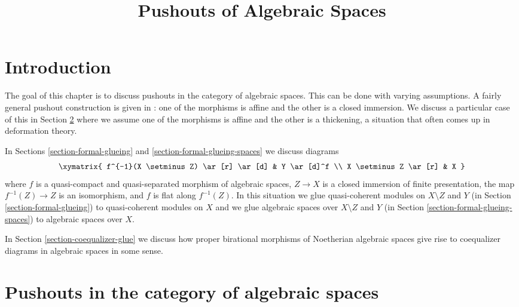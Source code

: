 

%


\title{Pushouts of Algebraic Spaces}


\maketitle

\label{section-phantom}

\tableofcontents

\section{Introduction}
\label{section-introduction}

\noindent
The goal of this chapter is to discuss pushouts in the category of
algebraic spaces. This can be done with varying assumptions.
A fairly general pushout construction is given in \cite{Temkin-Tyomkin}:
one of the morphisms is affine and the other is a closed immersion.
We discuss a particular case of this in Section \ref{section-pushouts}
where we assume one of the morphisms is affine and the other is a
thickening, a situation that often comes up in deformation theory.

\medskip\noindent
In Sections \ref{section-formal-glueing} and
\ref{section-formal-glueing-spaces} we discuss diagrams
$$
\xymatrix{
f^{-1}(X \setminus Z) \ar[r] \ar[d] & Y \ar[d]^f \\
X \setminus Z \ar[r] & X
}
$$
where $f$ is a quasi-compact and quasi-separated morphism of
algebraic spaces, $Z \to X$ is a closed immersion of finite presentation,
the map $f^{-1}(Z) \to Z$ is an isomorphism, and
$f$ is flat along $f^{-1}(Z)$. In this situation we glue
quasi-coherent modules on $X \setminus Z$ and $Y$
(in Section \ref{section-formal-glueing}) to quasi-coherent modules on $X$
and we glue algebraic spaces over $X \setminus Z$ and $Y$
(in Section \ref{section-formal-glueing-spaces}) to algebraic spaces over $X$.

\medskip\noindent
In Section \ref{section-coequalizer-glue} we discuss how proper birational
morphisms of Noetherian algebraic spaces give rise to coequalizer diagrams
in algebraic spaces in some sense.





\section{Pushouts in the category of algebraic spaces}
\label{section-pushouts}

